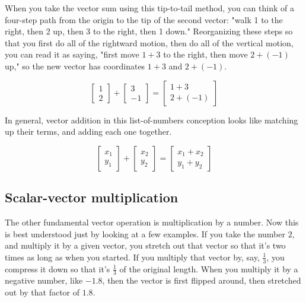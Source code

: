 When you take the vector sum using this tip-to-tail method, you can think of a
four-step path from the origin to the tip of the second vector: "walk 1 to the
right, then 2 up, then 3 to the right, then 1 down." Reorganizing these steps so
that you first do all of the rightward motion, then do all of the vertical
motion, you can read it as saying, "first move $1 + 3$ to the right, then move
$2 + (-1)$ up," so the new vector has coordinates $1 + 3$ and $2 + (-1)$.

\begin{equation*}
  \begin{bmatrix}
    1 \\
    2
  \end{bmatrix} + \begin{bmatrix}
    3 \\
    -1
  \end{bmatrix} = \begin{bmatrix}
    1 + 3 \\
    2 + (-1)
  \end{bmatrix}
\end{equation*}

In general, vector addition in this list-of-numbers conception looks like
matching up their terms, and adding each one together.

\begin{equation*}
  \begin{bmatrix}
    x_1 \\
    y_1
  \end{bmatrix} + \begin{bmatrix}
    x_2 \\
    y_2
  \end{bmatrix} = \begin{bmatrix}
    x_1 + x_2 \\
    y_1 + y_2
  \end{bmatrix}
\end{equation*}

\subsection{Scalar-vector multiplication}

The other fundamental vector operation is multiplication by a number. Now this
is best understood just by looking at a few examples. If you take the number
$2$, and multiply it by a given vector, you stretch out that vector so that it's
two times as long as when you started. If you multiply that vector by, say,
$\frac{1}{3}$, you compress it down so that it's $\frac{1}{3}$ of the original
length. When you multiply it by a negative number, like $-1.8$, then the vector
is first flipped around, then stretched out by that factor of $1.8$.

